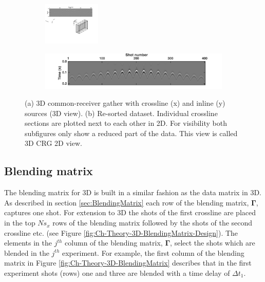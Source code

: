 \begin{figure}
	
	\begin{subfigure}[t]{\textwidth}
	 	\centering
		\includegraphics[width = 0.3\textwidth]{Plots/data3d}
		\caption{}
		\label{fig:Ch-Theory-Data3d}
	\end{subfigure}
	\par\bigskip
	\begin{subfigure}[t]{\textwidth}
		\centering
		\includegraphics[width = \textwidth]{Plots/IdealData3d/p_Delphi}
		\caption{}
		\label{fig:Ch-Theory-Data3d_Delphi}
	\end{subfigure}
	
	\caption{(a) 3D common-receiver gather with crossline (x) and inline (y) sources (3D view). (b) Re-sorted dataset. Individual crossline sections are plotted next to each other in 2D. For visibility both subfigures only show a reduced part of the data. This view is called 3D CRG 2D view.}
	\label{fig:Ch-Theory-DataSorting}
\end{figure}

\newpage
\subsection*{Blending matrix}

The blending matrix for 3D is built in a similar fashion as the data matrix in 3D. As described in section \ref{sec:BlendingMatrix} each row of the blending matrix, $\mathbf{\Gamma}$, captures one shot. For extension to 3D the shots of the first crossline are placed in the top $Ns_x$ rows of the blending matrix followed by the shots of the second crossline etc. (see Figure \ref{fig:Ch-Theory-3D-BlendingMatrix-Design}). The elements in the $j^{th}$ column of the blending matrix, $\mathbf{\Gamma}$, select the shots which are blended in the $j^{th}$ experiment. For example, the first column of the blending matrix in Figure \ref{fig:Ch-Theory-3D-BlendingMatrix} describes that in the first experiment shots (rows) one and three are blended with a time delay of $\Delta t_1$.

